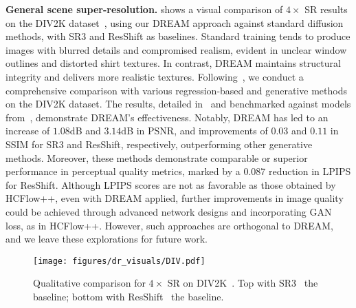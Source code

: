\textbf{General scene super-resolution.}  shows a visual comparison of $4\times$ SR results on the DIV2K dataset~\cite{agustsson2017ntire}, using our DREAM approach against standard diffusion methods, with SR3 and ResShift as baselines. Standard training tends to produce images with blurred details and compromised realism, evident in unclear window outlines and distorted shirt textures. In contrast, DREAM maintains structural integrity and delivers more realistic textures. Following~\cite{guo2022lar}, we conduct a comprehensive comparison with various regression-based and generative methods on the DIV2K dataset. The results, detailed in~ and benchmarked against models from~\cite{liang2021hierarchical}, demonstrate DREAM's effectiveness. Notably, DREAM has led to an increase of $1.08$dB and $3.14$dB in PSNR, and improvements of $0.03$ and $0.11$ in SSIM for SR3 and ResShift, respectively, outperforming other generative methods. Moreover, these methods demonstrate comparable or superior performance in perceptual quality metrics, marked by a 0.087 reduction in LPIPS for ResShift.  Although LPIPS scores are not as favorable as those obtained by HCFlow++, even with DREAM applied,  further improvements in image quality could be achieved through advanced network designs and incorporating GAN loss, as in HCFlow++.  However, such approaches are orthogonal to DREAM, and we leave these explorations for future work.

\begin{figure}[t]
    \centering
    \texttt{[image: figures/dr\_visuals/DIV.pdf]}
    \vspace{-.1in}
    \caption{
    Qualitative comparison for $4\times$ SR on DIV2K~\cite{agustsson2017ntire}. Top with SR3~\cite{saharia2022image} the baseline; bottom with ResShift~\cite{yue2023resshift} the baseline.} 
        \label{fig:div}
    \vspace{-.1in}
\end{figure}


